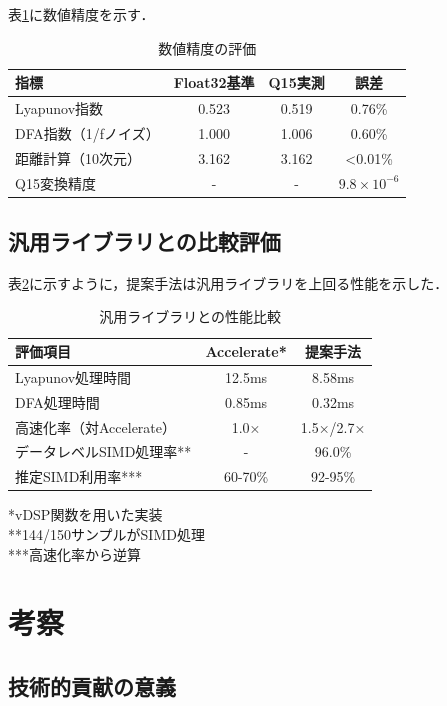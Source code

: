 \documentclass[paper]{ieice}
\begin{document}
表\ref{tab:accuracy}に数値精度を示す．

\begin{table}[t]
\caption{数値精度の評価}
\label{tab:accuracy}
\centering
\begin{tabular}{lccc}
\toprule
指標 & Float32基準 & Q15実測 & 誤差 \\
\midrule
Lyapunov指数 & 0.523 & 0.519 & 0.76\% \\
DFA指数（1/fノイズ） & 1.000 & 1.006 & 0.60\% \\
距離計算（10次元） & 3.162 & 3.162 & <0.01\% \\
Q15変換精度 & - & - & $9.8 \times 10^{-6}$ \\
\bottomrule
\end{tabular}
\end{table}

\subsection{汎用ライブラリとの比較評価}

表\ref{tab:library_comparison}に示すように，提案手法は汎用ライブラリを上回る性能を示した．

\begin{table}[t]
\caption{汎用ライブラリとの性能比較}
\label{tab:library_comparison}
\centering
\begin{tabular}{lcc}
\toprule
評価項目 & Accelerate* & 提案手法 \\
\midrule
Lyapunov処理時間 & 12.5ms & 8.58ms \\
DFA処理時間 & 0.85ms & 0.32ms \\
高速化率（対Accelerate） & 1.0× & 1.5×/2.7× \\
データレベルSIMD処理率** & - & 96.0\% \\
推定SIMD利用率*** & 60-70\% & 92-95\% \\
\bottomrule
\end{tabular}
\vspace{1mm}
\footnotesize{*vDSP関数を用いた実装}\\
\footnotesize{**144/150サンプルがSIMD処理}\\
\footnotesize{***高速化率から逆算}
\end{table}

\section{考察}

\subsection{技術的貢献の意義}
\end{document}
